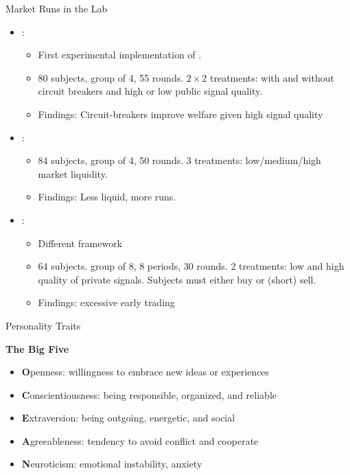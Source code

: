 \documentclass{beamer}
\begin{document}
\begin{frame}{Market Runs in the Lab}
\begin{itemize}
    \item \cite{magnani2020dynamic}: 
    \begin{itemize}
        \item First experimental implementation of \cite{bernardo2004liquidity}. \item 80 subjects, group of 4, 55 rounds. $2\times2$ treatments: with and without circuit breakers and high or low public signal quality.
        \item Findings: Circuit-breakers improve welfare given high signal quality
    \end{itemize}
        \vspace{0.1in}
    \item \cite{choi2022market}: 
        \begin{itemize}
        \item 84 subjects, group of 4, 50 rounds. 3 treatments: low/medium/high market liquidity.
        \item Findings: Less liquid, more runs.
        \end{itemize}
        \vspace{0.1in}
    \item \cite{kendall2020market}: 
            \begin{itemize}
        \item Different framework 
        \item 64 subjects. group of 8, 8 periods, 30 rounds. 2 treatments: low and high quality of private signals. Subjects must either buy or (short) sell.
        \item  Findings: excessive early trading
        \end{itemize}
\end{itemize}
\end{frame}


\begin{frame}{ Personality Traits}

\textbf{The Big Five}

    \begin{itemize}
    \item \textbf{O}penness: willingness to embrace new ideas or  experiences
    \item \textbf{C}onscientiousness: being responsible, organized, and reliable
    \item \textbf{E}xtraversion: being outgoing, energetic, and social
    \item \textbf{A}greeableness: tendency to avoid conflict and cooperate
    \item \textbf{N}euroticism: emotional instability, anxiety
    \end{itemize}
\end{frame}
\end{document}
